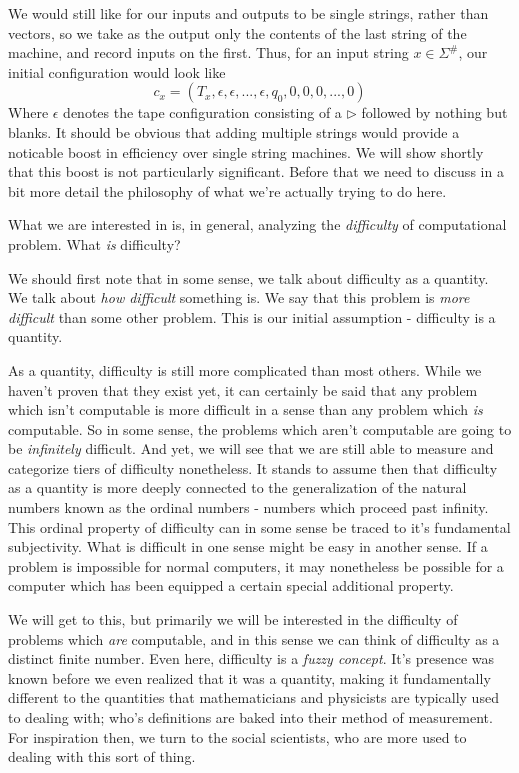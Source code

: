 We would still like for our inputs and outputs to be single strings, rather than vectors, so we take as the output only the contents of the last string of the machine, and record inputs on the first. Thus, for an input string $x\in \Sigma^\#$, our initial configuration would look like
\[c_x=(T_x,\epsilon, \epsilon,...,\epsilon,q_0,0,0,0,...,0) \]
Where $\epsilon$ denotes the tape configuration consisting of a $\triangleright$ followed by nothing but blanks. It should be obvious that adding multiple strings would provide a noticable boost in efficiency over single string machines. We will show shortly that this boost is not particularly significant. Before that we need to discuss in a bit more detail the philosophy of what we're actually trying to do here. 

What we are interested in is, in general, analyzing the \textit{difficulty} of computational problem. What \textit{is} difficulty? 

We should first note that in some sense, we talk about difficulty as a quantity. We talk about \textit{how difficult} something is. We say that this problem is \textit{more difficult} than some other problem. This is our initial assumption - difficulty is a quantity.

As a quantity, difficulty is still more complicated than most others. While we haven't proven that they exist yet, it can certainly be said that any problem which isn't computable is more difficult in a sense than any problem which \textit{is} computable. So in some sense, the problems which aren't computable are going to be \textit{infinitely} difficult. And yet, we will see that we are still able to measure and categorize tiers of difficulty nonetheless. It stands to assume then that difficulty as a quantity is more deeply connected to the generalization of the natural numbers known as the ordinal numbers - numbers which proceed past infinity. This ordinal property of difficulty can in some sense be traced to it's fundamental subjectivity. What is difficult in one sense might be easy in another sense. If a problem is impossible for normal computers, it may nonetheless be possible for a computer which has been equipped a certain special additional property. 

We will get to this, but primarily we will be interested in the difficulty of problems which \textit{are} computable, and in this sense we can think of difficulty as a distinct finite number. Even here, difficulty is a \textit{fuzzy concept}. It's presence was known before we even realized that it was a quantity, making it fundamentally different to the quantities that mathematicians and physicists are typically used to dealing with; who's definitions are baked into their method of measurement. For inspiration then, we turn to the social scientists, who are more used to dealing with this sort of thing. 

